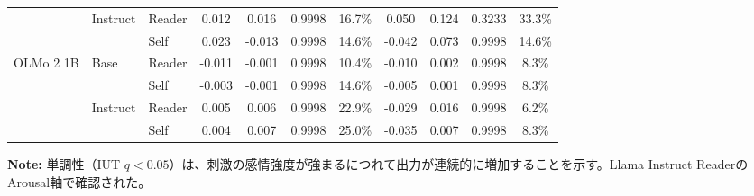 \begin{table}[htbp]
\begin{tabular}{lll cccc cccc}
\cmidrule(lr){2-11}
                       & \multirow{2}{*}{Instruct} & Reader     & 0.012 & 0.016 & 0.9998 & 16.7\% & 0.050 & 0.124 & 0.3233 & 33.3\% \\
                       &                      & Self       & 0.023 & -0.013 & 0.9998 & 14.6\% & -0.042 & 0.073 & 0.9998 & 14.6\% \\
\midrule
\multirow{4}{*}{OLMo 2 1B} & \multirow{2}{*}{Base} & Reader     & -0.011 & -0.001 & 0.9998 & 10.4\% & -0.010 & 0.002 & 0.9998 & 8.3\% \\
                       &                      & Self       & -0.003 & -0.001 & 0.9998 & 14.6\% & -0.005 & 0.001 & 0.9998 & 8.3\% \\
\cmidrule(lr){2-11}
                       & \multirow{2}{*}{Instruct} & Reader     & 0.005 & 0.006 & 0.9998 & 22.9\% & -0.029 & 0.016 & 0.9998 & 6.2\% \\
                       &                      & Self       & 0.004 & 0.007 & 0.9998 & 25.0\% & -0.035 & 0.007 & 0.9998 & 8.3\% \\
\bottomrule
\end{tabular}
\vspace{1ex}
\begin{minipage}{\linewidth}
\footnotesize
\textbf{Note:} 単調性（IUT $q < 0.05$）は、刺激の感情強度が強まるにつれて出力が連続的に増加することを示す。Llama Instruct ReaderのArousal軸で確認された。
\end{minipage}
\end{table}